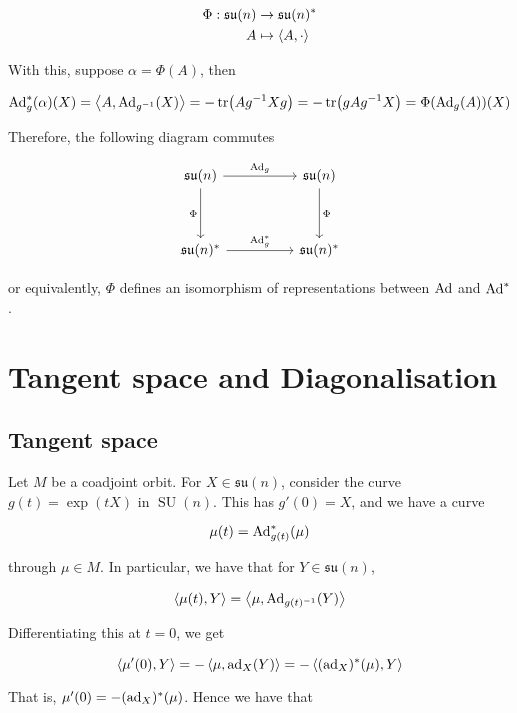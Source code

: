 \documentclass{article}
\DeclareMathOperator{\SU}{SU}
\newcommand{\su}{\mathfrak{su}}
\begin{document}
\begin{align*}
    \Phi : \su(n) &\to \su(n)^* \\
    A &\mapsto \inner{A, \cdot}
\end{align*}

With this, suppose \(\alpha = \Phi(A)\), then

\[\operatorname{Ad}_g^*(\alpha)(X) = \left\langle A, \operatorname{Ad}_{g^{-1}}(X) \right\rangle = -\tr(Ag^{-1}Xg) = -\tr(gAg^{-1}X) = \Phi(\operatorname{Ad}_g(A))(X)\]

Therefore, the following diagram commutes

\[\begin{tikzcd}
	{\su(n)} && {\su(n)} \\
	\\
	{\su(n)^*} && {\su(n)^*}
	\arrow["{\Ad_g^*}", from=3-1, to=3-3]
	\arrow["{\Ad_g}", from=1-1, to=1-3]
	\arrow["\Phi"', from=1-1, to=3-1]
	\arrow["\Phi", from=1-3, to=3-3]
\end{tikzcd}\]

or equivalently, \(\Phi\) defines an isomorphism of representations between \(\operatorname{Ad}\) and \(\operatorname{Ad}^*\).

\section{Tangent space and Diagonalisation}

\subsection{Tangent space}

Let \( M\) be a coadjoint orbit. For \(X \in \su(n)\), consider the curve \(g(t) = \exp(tX)\) in \(\SU(n)\). This has \(g'(0) = X\), and we have a curve

\[\mu(t) = \operatorname{Ad}_{g(t)}^*(\mu)\]

through \(\mu \in  M\). In particular, we have that for \(Y \in \su(n)\),

\[\left\langle \mu(t), Y \right\rangle = \left\langle \mu, \operatorname{Ad}_{g(t)^{-1}}(Y) \right\rangle\]

Differentiating this at \(t = 0\), we get

\[\left\langle \mu'(0), Y \right\rangle = -\left\langle \mu, \operatorname{ad}_X(Y) \right\rangle = -\left\langle (\operatorname{ad}_X)^*(\mu), Y \right\rangle\]

That is, \(\mu'(0) = -(\operatorname{ad}_X)^*(\mu)\). Hence we have that
\end{document}
